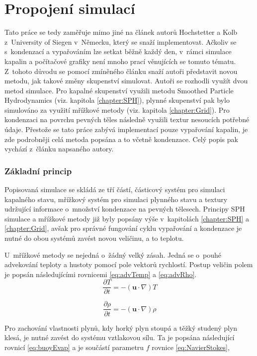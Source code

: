 \section{Propojení simulací}
\label{chapter:evap}
Tato práce se tedy zaměřuje mimo jiné na článek \cite{Evap&Cond} autorů Hochstetter a Kolb z~University of Siegen v~Německu, který se snaží implementovat. Ačkoliv se s~kondenzací a vypařováním lze setkat běžně každý den, v~rámci simulace kapalin a počítačové grafiky není mnoho prací věnujících se tomuto tématu. Z~tohoto důvodu se pomocí zmíněného článku snaží autoři představit novou metodu, jak takové změny skupenství simulovat. Autoři se rozhodli využít dvou metod simulace. Pro kapalné skupenství využili metodu Smoothed Particle Hydrodynamics (viz. kapitola \ref{chapter:SPH}), plynné skupenství pak bylo simulováno za využití mřížkové metody (viz. kapitola \ref{chapter:Grid}). Pro kondenzaci na povrchu pevných těles následně využili textur nesoucích potřebné údaje. Přestože se tato práce zabývá implementací pouze vypařování kapalin, je zde podrobněji celá metoda popsána a to včetně kondenzace. Celý popis pak vychází z~článku napsaného autory. \cite{Evap&Cond}

\subsubsection{Základní princip}
Popisovaná simulace se skládá ze tří částí, částicový systém pro simulaci kapalného stavu, mřížkový systém pro simulaci plynného stavu a textury udržující informace o~množství kondenzace na pevných tělesech. Principy SPH simulace a mřížkové metody již byly popsány výše v~kapitolách \ref{chapter:SPH} a \ref{chapter:Grid}, avšak pro správné fungování cyklu vypařování a kondenzace je nutné do obou systémů zavést novou veličinu, a to teplotu.

U~mřížkové metody se nejedná o~žádný velký zásah. Jedná se o~pouhé advekování teploty a hustoty pomocí pole vektorů rychlostí. Postup veličin polem je popsán následujícími rovnicemi \ref{eq:advTemp} a \ref{eq:advRho}.
\begin{equation}
	\frac{\partial T}{\partial t} = -(\mathbf{u} \cdot \nabla)T
	\label{eq:advTemp}
\end{equation}

\begin{equation}
	\frac{\partial \rho}{\partial t} = -(\mathbf{u} \cdot \nabla)\rho
	\label{eq:advRho}
\end{equation}

Pro zachování vlastnosti plynů, kdy horký plyn stoupá a těžký studený plyn klesá, je nutné zavést do systému vztlakovou sílu. Ta je popsána následující rovnicí \ref{eq:buoyEvap} a je součástí parametru $f$ rovnice \ref{eq:NavierStokes},

